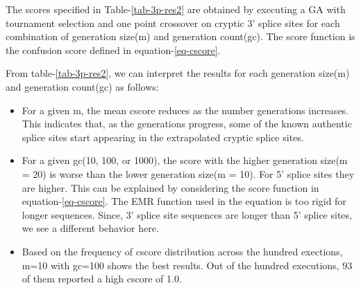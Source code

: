 The scores specified in Table-\ref{tab-3p-res2} are obtained by executing a GA with tournament selection and one point crossover on cryptic 3' splice sites for each combination of generation size(m) and generation count(gc). The score function is the confusion score defined in equation-\ref{eq-cscore}. \par
From table-\ref{tab-3p-res2}, we can interpret the results for each generation size(m) and generation count(gc) as follows:
\begin{itemize}
	\item For a given m, the mean cscore reduces as the number generations increases. This indicates that, as the generations progress, some of the known authentic splice sites start appearing in the extrapolated cryptic splice sites.
	\item For a given gc(10, 100, or 1000), the score with the higher generation size(m = 20) is worse than the lower generation size(m = 10). For 5' splice sites they are higher. This can be explained by considering the score function in equation-\ref{eq-cscore}. The EMR function used in the equation is too rigid for longer sequences. Since, 3' splice site sequences are longer than 5' splice sites, we see a different behavior here.
	\item Based on the frequency of cscore distribution across the hundred exections, m=10 with gc=100 shows the best results. Out of the hundred executions, 93 of them reported a high cscore of 1.0.
\end{itemize} 

